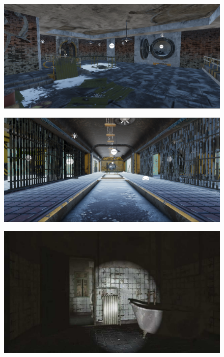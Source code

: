 \begin{figure}[H]
\centering
\begin{minipage}{.5\textwidth}
  \centering
  \includegraphics[width=.8\linewidth]{img/egouts/1.PNG}
  \label{fig:chap3}
\end{minipage}%
\begin{minipage}{.5\textwidth}
  \centering
  \includegraphics[width=.8\linewidth]{img/egouts/3.png}
  \label{fig:chap3bis}
\end{minipage}
\end{figure}

\begin{figure}[H]
\centering
\begin{minipage}{.5\textwidth}
  \centering
  \centerline{\includegraphics[width=1\linewidth]{img/egouts/light.jpg}}
  \label{fig:flashlight}
\end{minipage}%
\end{figure}

